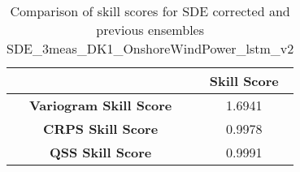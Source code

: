
        \begin{table}[h!]
            \centering
            \begin{tabular}{|c|c|}
                \hline
                & \textbf{Skill Score}  \\
                \hline
                \textbf{Variogram Skill Score} & 1.6941  \\
                \hline
                \textbf{CRPS Skill Score} & 0.9978  \\
                \hline
                \textbf{QSS Skill Score} & 0.9991 \\
                \hline
            \end{tabular}
            \caption{Comparison of skill scores for SDE corrected and previous ensembles SDE_3meas_DK1_OnshoreWindPower_lstm_v2}
            \label{table:skill_scores_comparison}
        \end{table}
        